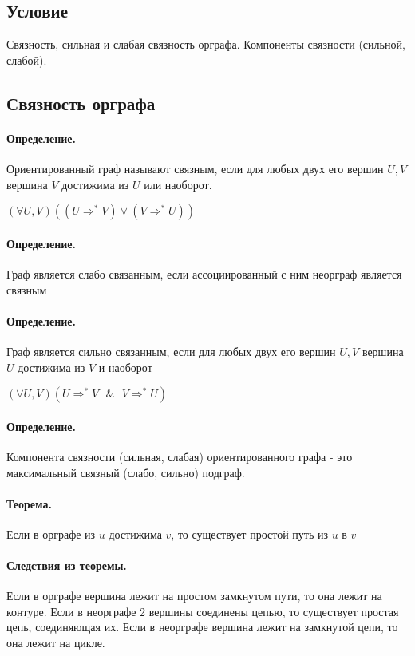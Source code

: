 \documentclass{report}
\newcommand{\band}{\mbox{ } \& \mbox{ }}
\newcommand{\pathto}[1][1]{ \Rightarrow^{*}_{#1} }
\begin{document}
\subsection{Условие}
 Связность, сильная и слабая связность орграфа. Компоненты
связности (сильной, слабой).

\subsection{Связность орграфа}

\paragraph*{Определение.}
Ориентированный граф называют связным, если для любых двух его вершин $U, V$ вершина
 $V$ достижима из  $U$ или наоборот.

 $(\forall U,V)((U \Rightarrow^{*} V) \lor (V \pathto[] U))$

\paragraph*{Определение.}
Граф является слабо связанным, если ассоциированный с ним неорграф является связным

\paragraph*{Определение.}
Граф является сильно связанным, если для любых двух его вершин $U, V$ вершина  $U$ достижима
из  $V$ и наоборот

$(\forall U,V)(U \pathto[] V \band V \pathto[] U)$

 \paragraph*{Определение.}
 Компонента связности (сильная, слабая) ориентированного графа - это максимальный связный
 (слабо, сильно) подграф.

\paragraph*{Теорема.}
Если в орграфе из $u$ достижима  $v$, то существует простой путь из  $u$ в  $v$

\paragraph*{Следствия из теоремы.}
Если в орграфе вершина лежит на простом замкнутом пути, то она лежит на контуре.
Если в неорграфе 2 вершины соединены цепью, то существует простая цепь, соединяющая их.
Если в неорграфе вершина лежит на замкнутой цепи, то она лежит на цикле.
\end{document}
